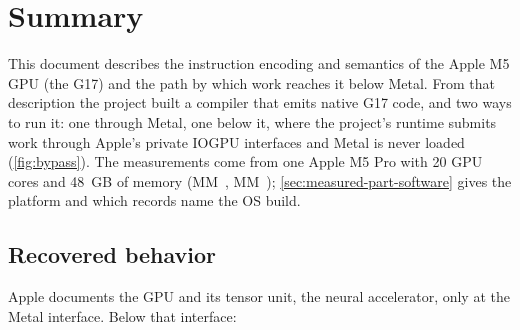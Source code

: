 \chapter{Summary}\label{ch:work-brief}

This document describes the instruction encoding and semantics of the Apple M5 GPU (the G17) and the path by which
work reaches it below Metal. From that description the project built a compiler that emits native
G17 code, and two ways to run it: one through Metal, one below it, where the project's runtime submits
work through Apple's private IOGPU interfaces and Metal is never loaded (\cref{fig:bypass}). The measurements
come from one Apple M5 Pro with 20 GPU cores and 48~GB of memory (MM~, MM~); \cref{sec:measured-part-software}
gives the platform and which records name the OS build.\label{sec:part-software}

\section{Recovered behavior}\label{sec:has-been-recovered}

Apple documents the GPU and its tensor unit, the neural accelerator, only at the Metal interface. Below that
interface:

